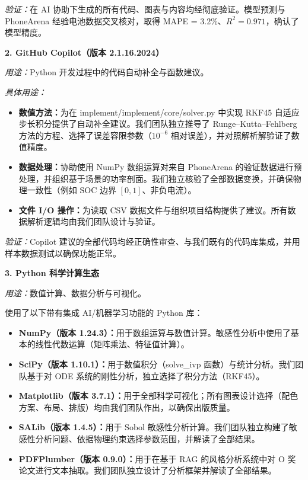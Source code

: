 \documentclass[11pt,a4paper]{ctexart}
\begin{document}
\emph{验证：}在 AI 协助下生成的所有代码、图表与内容均经彻底验证。模型预测与 PhoneArena 经验电池数据交叉核对，取得 MAPE = 3.2\%、$R^2 = 0.971$，确认了模型精度。

\textbf{2. GitHub Copilot（版本 2.1.16.2024）}

\emph{用途：}Python 开发过程中的代码自动补全与函数建议。

\emph{具体用途：}
\begin{itemize}[leftmargin=1.8em,itemsep=0.25em]
\item \textbf{数值方法：}为在 implement/implement/core/solver.py 中实现 RKF45 自适应步长积分提供了自动补全建议。我们团队独立推导了 Runge--Kutta--Fehlberg 方法的方程、选择了误差容限参数（$10^{-6}$ 相对误差），并对照解析解验证了数值精度。
\item \textbf{数据处理：}协助使用 NumPy 数组运算对来自 PhoneArena 的验证数据进行预处理，并组织基于场景的功率剖面。我们独立核验了全部数据变换，并确保物理一致性（例如 SOC 边界 $[0,1]$、非负电流）。
\item \textbf{文件 I/O 操作：}为读取 CSV 数据文件与组织项目结构提供了建议。所有数据解析逻辑均由我们团队设计与验证。
\end{itemize}

\emph{验证：}Copilot 建议的全部代码均经正确性审查、与我们既有的代码库集成，并用样本数据测试以确保功能正常。

\textbf{3. Python 科学计算生态}

\emph{用途：}数值计算、数据分析与可视化。

使用了以下带有集成 AI/机器学习功能的 Python 库：
\begin{itemize}[leftmargin=1.8em,itemsep=0.25em]
\item \textbf{NumPy（版本 1.24.3）：}用于数组运算与数值计算。敏感性分析中使用了基本的线性代数运算（矩阵乘法、特征值计算）。
\item \textbf{SciPy（版本 1.10.1）：}用于数值积分（solve\_ivp 函数）与统计分析。我们团队基于对 ODE 系统的刚性分析，独立选择了积分方法（RKF45）。
\item \textbf{Matplotlib（版本 3.7.1）：}用于全部科学可视化；所有图表设计选择（配色方案、布局、排版）均由我们团队作出，以确保出版质量。
\item \textbf{SALib（版本 1.4.5）：}用于 Sobol 敏感性分析计算。我们团队独立构建了敏感性分析问题、依据物理约束选择参数范围，并解读了全部结果。
\item \textbf{PDFPlumber（版本 0.9.0）：}用于在基于 RAG 的风格分析系统中对 O 奖论文进行文本抽取。我们团队独立设计了分析框架并解读了全部结果。
\end{itemize}
\end{document}
